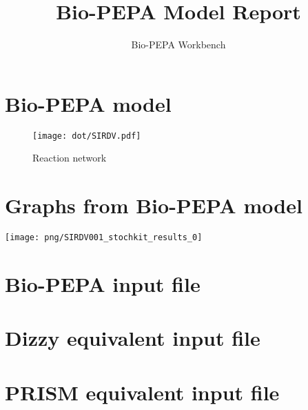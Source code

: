 \documentclass{llncs}
\title{Bio-PEPA Model Report}
\author{Bio-PEPA Workbench}
\institute{\today}
\begin{document}
\maketitle
\section{Bio-PEPA model}

\begin{figure}[htbp]
\begin{center}
\texttt{[image: dot/SIRDV.pdf]}
\caption{Reaction network}
\end{center}
\end{figure}
\newpage
\section{Graphs from Bio-PEPA model}
\texttt{[image: png/SIRDV001\_stochkit\_results\_0]}
\appendix
\newpage
\section{Bio-PEPA input file}

\newpage
\section{Dizzy equivalent input file}

\newpage
\section{PRISM equivalent input file}

\end{document}
